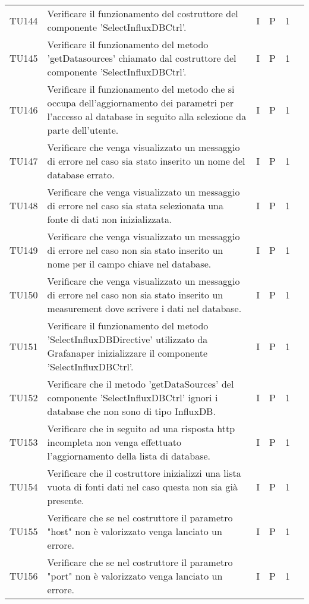 \begin{longtable} {
		>{}p{12mm}
		>{}p{79.5mm}
		>{}p{9mm}
		>{}p{8mm}
		>{}p{14mm}
		>{}p{0mm}}
	TU144		& Verificare il funzionamento del costruttore del componente 'SelectInfluxDBCtrl'. & I & P & 1 & \TBstrut \\ [2mm]
	TU145		& Verificare il funzionamento del metodo 'getDatasources' chiamato dal costruttore del componente 'SelectInfluxDBCtrl'. & I & P & 1 & \TBstrut \\ [2mm]
	TU146		& Verificare il funzionamento del metodo che si occupa dell'aggiornamento dei parametri per l'accesso al database in seguito alla selezione da parte dell'utente. & I & P & 1 & \TBstrut \\ [2mm]
	TU147		& Verificare che venga visualizzato un messaggio di errore nel caso sia stato inserito un nome del database errato. & I & P & 1 & \TBstrut \\ [2mm]
	TU148		& Verificare che venga visualizzato un messaggio di errore nel caso sia stata selezionata una fonte di dati non inizializzata. & I & P & 1 & \TBstrut \\ [2mm]
	TU149		& Verificare che venga visualizzato un messaggio di errore nel caso non sia stato inserito un nome per il campo chiave nel database. & I & P & 1 & \TBstrut \\ [2mm]
	TU150		& Verificare che venga visualizzato un messaggio di errore nel caso non sia stato inserito un measurement dove scrivere i dati nel database. & I & P & 1 & \TBstrut \\ [2mm]
	TU151		& Verificare il funzionamento del metodo 'SelectInfluxDBDirective' utilizzato da Grafana\glosp per inizializzare il componente 'SelectInfluxDBCtrl'. & I & P & 1 & \TBstrut \\ [2mm]
	TU152		& Verificare che il metodo 'getDataSources' del componente 'SelectInfluxDBCtrl' ignori i database che non sono di tipo InfluxDB. & I & P & 1 & \TBstrut \\ [2mm]
	TU153		& Verificare che in seguito ad una risposta http incompleta non venga effettuato l'aggiornamento della lista di database. & I & P & 1 & \TBstrut \\ [2mm]
	TU154		& Verificare che il costruttore inizializzi una lista vuota di fonti dati nel caso questa non sia già presente. & I & P & 1 & \TBstrut \\ [2mm]
	TU155		& Verificare che se nel costruttore il parametro "host" non è valorizzato venga lanciato un errore. & I & P & 1 & \TBstrut \\ [2mm]
	TU156		& Verificare che se nel costruttore il parametro "port" non è valorizzato venga lanciato un errore. & I & P & 1 & \TBstrut \\ [2mm]

\end{longtable}
